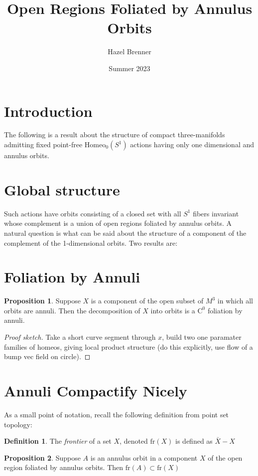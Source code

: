 \documentclass[10pt, oneside]{article}
\title{Open Regions Foliated by Annulus Orbits}
\author{Hazel Brenner}
\date{Summer 2023}
\newcommand{\homeoS}{\text{Homeo}_0(S^1)}
\theoremstyle{definition}
\newtheorem{defn}{Definition}
\newtheorem{prop}{Proposition}
\theoremstyle{definition}
\begin{document}
\maketitle

\section{Introduction}
The following is a result about the structure of compact three-manifolds admitting fixed point-free $\homeoS$ actions having only one dimensional and annulus orbits.

\section{Global structure}
Such actions have orbits consisting of a closed set with all $S^1$ fibers invariant whose complement is a union of open regions foliated by annulus orbits. A natural question is what can be said about the structure of a component of the complement of the 1-dimensional orbits. Two results are:

\section{Foliation by Annuli}
\begin{prop}
    Suppose $X$ is a component of the open subset of $M^3$ in which all orbits are annuli. Then the decomposition of $X$ into orbits is a $\text{C}^0$ foliation by annuli.
\end{prop}
\begin{proof}[Proof sketch]
    Take a short curve segment through $x$, build two one paramater families of homeos, giving local product structure (do this explicitly, use flow of a bump vec field on circle).
\end{proof}

\section{Annuli Compactify Nicely}
As a small point of notation, recall the following definition from point set topology:
\begin{defn}
    The {\it frontier} of a set $X$, denoted $\text{fr}(X)$ is defined as $\bar{X}-X$
\end{defn}

\begin{prop}
    Suppose $A$ is an annulus orbit in a component $X$ of the open region foliated by annulus orbits. Then $\text{fr}(A)\subset \text{fr}(X)$
\end{prop}
\end{document}
